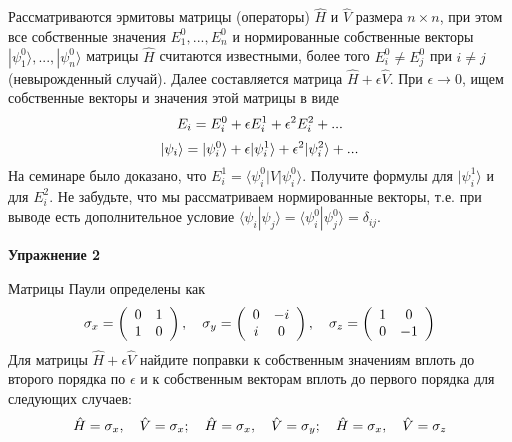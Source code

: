 \documentclass[a4paper,12pt]{article}
\begin{document}
\noindent Рассматриваются эрмитовы матрицы (операторы) $\hat{H}$ и $\hat{V}$ размера $n\times n$, при этом все собственные значения $E_{1}^{0},...,E_{n}^{0}$ и нормированные собственные векторы $|\psi_{1}^{0}\rangle,...,|\psi_{n}^{0}\rangle$ матрицы $\hat{H}$ считаются известными, более того $E_{i}^{0}\neq E_{j}^{0}$ при $i\neq j$ (невырожденный случай). Далее составляется матрица $\hat{H}+\epsilon\hat{V}$. При $\epsilon\rightarrow 0$, ищем собственные векторы и значения этой матрицы в виде
\begin{equation}\notag
E_{i}	=E_{i}^{0}+\epsilon E_{i}^{1}+\epsilon^{2}E_{i}^{2}+...
\end{equation}
\begin{equation}
\notag
|\psi_{i}\rangle	=|\psi_{i}^{0}\rangle+\epsilon|\psi_{i}^{1}\rangle+\epsilon^{2}|\psi_{i}^{2}\rangle+...
\end{equation}
\noindent На семинаре было доказано, что $E_{i}^{1}=\langle\psi_{i}^{0}|V|\psi_{i}^{0}\rangle$. Получите формулы для $|\psi_{i}^{1}\rangle$ и для $E_{i}^{2}$. Не забудьте, что мы рассматриваем нормированные векторы, т.е. при выводе есть дополнительное условие $\langle\psi_{i}|\psi_{j}\rangle=\langle\psi_{i}^{0}|\psi_{j}^{0}\rangle=\delta_{ij}$.

\vspace{15pt}
\noindent \textbf{Упражнение 2}

\noindent Матрицы Паули определены как
\begin{equation}\notag
\sigma_{x}	=\left(\begin{array}{cc}
0 & 1\\
1 & 0
\end{array}\right),\quad\sigma_{y}=\left(\begin{array}{cc}
0 & -i\\
i & 0
\end{array}\right),\quad\sigma_{z}=\left(\begin{array}{cc}
1 & 0\\
0 & -1
\end{array}\right)
\end{equation}
\noindent Для матрицы $\hat{H}+\epsilon\hat{V}$ найдите поправки к собственным значениям вплоть до второго порядка по $\epsilon$ и к собственным векторам вплоть до первого порядка для следующих случаев: 
\begin{equation}\notag
	\hat{H}=\sigma_{x},\quad\hat{V}=\sigma_{x};\quad\hat{H}=\sigma_{x},\quad\hat{V}=\sigma_{y};\quad\hat{H}=\sigma_{x},\quad\hat{V}=\sigma_{z}
\end{equation}
\end{document}
